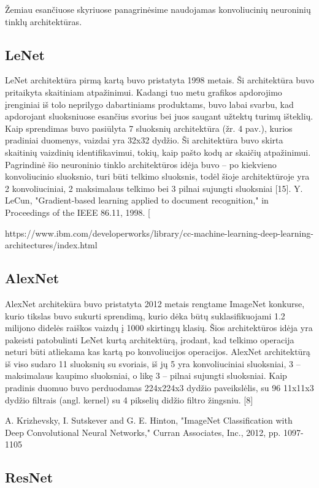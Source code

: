 \documentclass{VUMIFInfBakalaurinis}
\begin{document}
Žemiau esančiuose skyriuose panagrinėsime naudojamas konvoliucinių neuroninių tinklų architektūras.

\subsection{LeNet}

LeNet architektūra pirmą kartą buvo pristatyta 1998 metais. Ši architektūra buvo pritaikyta skaitiniam atpažinimui. Kadangi tuo metu grafikos apdorojimo įrenginiai iš tolo neprilygo dabartiniams produktams, buvo  labai svarbu, kad apdorojant sluoksniuose esančius svorius bei juos saugant  užtektų turimų išteklių. Kaip sprendimas buvo pasiūlyta 7 sluoksnių architektūra (žr. 4 pav.), kurios pradiniai duomenys, vaizdai  yra 32x32 dydžio. Ši architektūra buvo skirta skaitinių vaizdinių identifikavimui, tokių, kaip pašto kodų ar skaičių atpažinimui. Pagrindinė šio neuroninio tinklo architektūros idėja buvo – po kiekvieno konvoliucinio sluoksnio, turi būti telkimo sluoksnis, todėl šioje architektūroje yra 2 konvoliuciniai, 2 maksimalaus telkimo bei 3 pilnai sujungti sluoksniai [15].  Y. LeCun, "Gradient-based learning applied to document recognition," in Proceedings of the IEEE 86.11, 1998.  
[

https://www.ibm.com/developerworks/library/cc-machine-learning-deep-learning-architectures/index.html

\subsection{AlexNet}
AlexNet architekūra buvo pristatyta 2012 metais rengtame ImageNet konkurse, kurio tikslas buvo sukurti sprendimą, kurio dėka būtų suklasifikuojami 1.2 milijono didelės raiškos vaizdų į 1000 skirtingų klasių. Šios architektūros idėja yra pakeisti patobulinti LeNet kurtą architektūrą, įrodant, kad telkimo operacija neturi būti atliekama kas kartą po konvoliucijos operacijos. AlexNet architektūrą iš viso sudaro 11 sluoksnių su svoriais, iš jų 5 yra konvoliuciniai sluoksniai, 3 – maksimalaus kaupimo sluoksniai, o likę 3 – pilnai sujungti sluoksniai. Kaip pradinis duomuo buvo perduodamas 224x224x3 dydžio paveikslėlis, su 96 11x11x3 dydžio filtrais (angl. kernel) su 4 pikselių didžio filtro žingsniu. [8]  
 
 A. Krizhevsky, I. Sutskever and G. E. Hinton, "ImageNet Classification with Deep Convolutional Neural Networks," Curran Associates, Inc., 2012, pp. 1097-1105
 
\subsection{ResNet}
\end{document}
